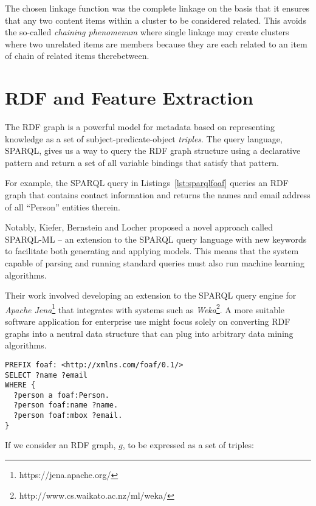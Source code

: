 The chosen linkage function was the complete linkage
on the basis that it ensures that any two content items
within a cluster to be considered related. This avoids the so-called
\emph{chaining phenomenum} where single linkage may create clusters
where two unrelated items are members because they are each related
to an item of chain of related items
therebetween.\cite{everitt2011hierarchical}

\section{RDF and Feature Extraction}
\label{sec:rdf-and-features}

The RDF graph is a powerful model
for metadata based on representing knowledge as a set of
subject-predicate-object \emph{triples}. The query language, SPARQL, gives us a
way to query the RDF graph structure using a declarative pattern and return a
set of all variable bindings that satisfy that pattern.

For example, the SPARQL query in Listings~\ref{lst:sparqlfoaf}
queries an RDF graph that contains contact information and returns the
names and email address of all ``Person'' entities therein.

Notably, Kiefer, Bernstein and Locher\cite{kiefer2008adding} proposed a novel
approach called SPARQL-ML -- an extension to the
SPARQL\cite{segaran2009programming} query language with new keywords to
facilitate both generating and applying models. This means that the system
capable of parsing and running standard queries must also run machine learning
algorithms.

Their work involved developing an extension to the SPARQL query
engine for \emph{Apache Jena}\footnote{https://jena.apache.org/} that integrates
with systems such as \emph{Weka}\footnote{http://www.cs.waikato.ac.nz/ml/weka/}.
A more suitable software application for enterprise use might focus solely on
converting RDF graphs into a neutral data structure that can plug into arbitrary
data mining algorithms.

\begin{lstlisting}[label=lst:sparqlfoaf,caption={Example SPARQL query for people's names and email addresses},language=sparql]
PREFIX foaf: <http://xmlns.com/foaf/0.1/>
SELECT ?name ?email
WHERE {
  ?person a foaf:Person.
  ?person foaf:name ?name.
  ?person foaf:mbox ?email.
}
\end{lstlisting}

If we consider an RDF graph, $g$, to be expressed as a set of triples:

